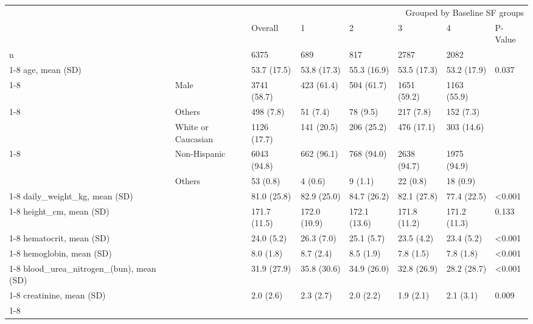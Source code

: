 \begin{tabular}{llllllll}
\toprule
 &  & \multicolumn{6}{r}{Grouped by Baseline SF groups} \\
 &  & Overall & 1 & 2 & 3 & 4 & P-Value \\
\midrule
n &  & 6375 & 689 & 817 & 2787 & 2082 &  \\
\cline{1-8}
age, mean (SD) &  & 53.7 (17.5) & 53.8 (17.3) & 55.3 (16.9) & 53.5 (17.3) & 53.2 (17.9) & 0.037 \\
\cline{1-8}
\multirow[t]{2}{*}{gender, n (%
 & Male & 3741 (58.7) & 423 (61.4) & 504 (61.7) & 1651 (59.2) & 1163 (55.9) &  \\
\cline{1-8}
\multirow[t]{3}{*}{race, n (%
 & Others & 498 (7.8) & 51 (7.4) & 78 (9.5) & 217 (7.8) & 152 (7.3) &  \\
 & White or Caucasian & 1126 (17.7) & 141 (20.5) & 206 (25.2) & 476 (17.1) & 303 (14.6) &  \\
\cline{1-8}
\multirow[t]{3}{*}{ethnicity, n (%
 & Non-Hispanic & 6043 (94.8) & 662 (96.1) & 768 (94.0) & 2638 (94.7) & 1975 (94.9) &  \\
 & Others & 53 (0.8) & 4 (0.6) & 9 (1.1) & 22 (0.8) & 18 (0.9) &  \\
\cline{1-8}
daily_weight_kg, mean (SD) &  & 81.0 (25.8) & 82.9 (25.0) & 84.7 (26.2) & 82.1 (27.8) & 77.4 (22.5) & <0.001 \\
\cline{1-8}
height_cm, mean (SD) &  & 171.7 (11.5) & 172.0 (10.9) & 172.1 (13.6) & 171.8 (11.2) & 171.2 (11.3) & 0.133 \\
\cline{1-8}
hematocrit, mean (SD) &  & 24.0 (5.2) & 26.3 (7.0) & 25.1 (5.7) & 23.5 (4.2) & 23.4 (5.2) & <0.001 \\
\cline{1-8}
hemoglobin, mean (SD) &  & 8.0 (1.8) & 8.7 (2.4) & 8.5 (1.9) & 7.8 (1.5) & 7.8 (1.8) & <0.001 \\
\cline{1-8}
blood_urea_nitrogen_(bun), mean (SD) &  & 31.9 (27.9) & 35.8 (30.6) & 34.9 (26.0) & 32.8 (26.9) & 28.2 (28.7) & <0.001 \\
\cline{1-8}
creatinine, mean (SD) &  & 2.0 (2.6) & 2.3 (2.7) & 2.0 (2.2) & 1.9 (2.1) & 2.1 (3.1) & 0.009 \\
\cline{1-8}
}}}
\end{tabular}
